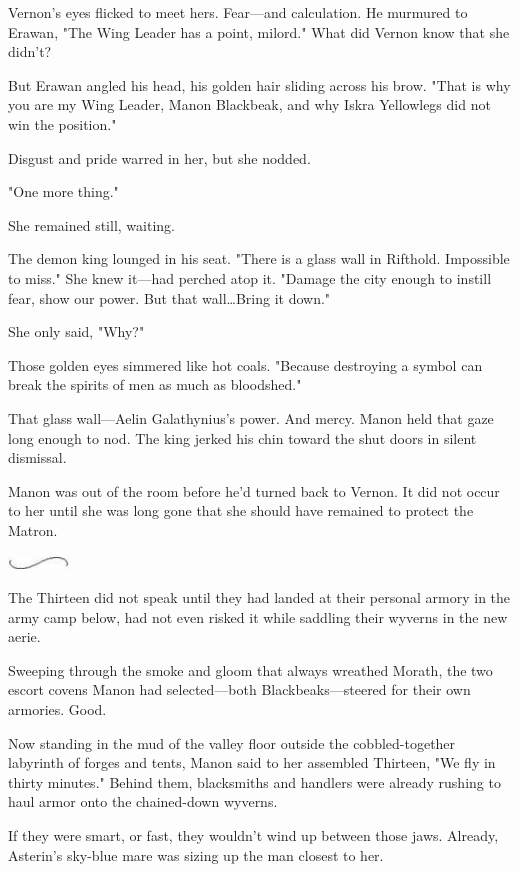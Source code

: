 Vernon's eyes flicked to meet hers.
Fear---and calculation.
He murmured to Erawan, "The Wing Leader has a point, milord."
What did Vernon know that she didn't?

But Erawan angled his head, his golden hair sliding across his brow.
"That is why you are my Wing Leader, Manon Blackbeak, and why Iskra Yellowlegs did not win the position."

Disgust and pride warred in her, but she nodded.

"One more thing."

She remained still, waiting.

The demon king lounged in his seat.
"There is a glass wall in Rifthold.
Impossible to miss."
She knew it---had perched atop it.
"Damage the city enough to instill fear, show our power.
But that wall\ldots Bring it down."

She only said, "Why?"

Those golden eyes simmered like hot coals.
"Because destroying a symbol can break the spirits of men as much as bloodshed."

That glass wall---Aelin Galathynius's power.
And mercy.
Manon held that gaze long enough to nod.
The king jerked his chin toward the shut doors in silent dismissal.

Manon was out of the room before he'd turned back to Vernon.
It did not occur to her until she was long gone that she should have remained to protect the Matron.

\begin{center}
    \includegraphics[width=0.65in,height=0.13in]{images/seperator}
\end{center}

The Thirteen did not speak until they had landed at their personal armory in the army camp below, had not even risked it while saddling their wyverns in the new aerie.

Sweeping through the smoke and gloom that always wreathed Morath, the two escort covens Manon had selected---both Blackbeaks---steered for their own armories.
Good.

Now standing in the mud of the valley floor outside the cobbled-together labyrinth of forges and tents, Manon said to her assembled Thirteen, "We fly in thirty minutes."
Behind them, blacksmiths and handlers were already rushing to haul armor onto the chained-down wyverns.

If they were smart, or fast, they wouldn't wind up between those jaws.
Already, Asterin's sky-blue mare was sizing up the man closest to her.

